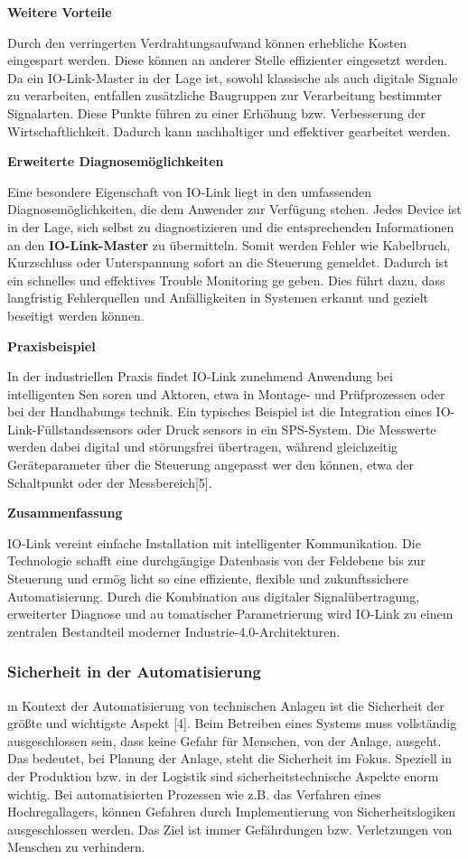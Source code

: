 \textbf{Weitere Vorteile}



Durch den verringerten Verdrahtungsaufwand können erhebliche Kosten eingespart
werden. Diese können an anderer Stelle effizienter eingesetzt werden.
Da ein IO-Link-Master in der Lage ist, sowohl klassische als auch digitale Signale zu
verarbeiten, entfallen zusätzliche Baugruppen zur Verarbeitung bestimmter Signalarten.
Diese Punkte führen zu einer Erhöhung bzw. Verbesserung der Wirtschaftlichkeit.
Dadurch kann nachhaltiger und effektiver gearbeitet werden.


\textbf{Erweiterte Diagnosemöglichkeiten}


Eine besondere Eigenschaft von IO-Link liegt in den umfassenden Diagnosemöglichkeiten, die dem Anwender zur Verfügung stehen. Jedes Device ist in der Lage, sich selbst
zu diagnostizieren und die entsprechenden Informationen an den \textbf{IO-Link-Master} zu
übermitteln.
Somit werden Fehler wie Kabelbruch, Kurzschluss oder Unterspannung sofort an die
Steuerung gemeldet. Dadurch ist ein schnelles und effektives Trouble Monitoring ge
geben. Dies führt dazu, dass langfristig Fehlerquellen und Anfälligkeiten in Systemen
erkannt und gezielt beseitigt werden können.


\textbf{Praxisbeispiel}


In der industriellen Praxis findet IO-Link zunehmend Anwendung bei intelligenten Sen
soren und Aktoren, etwa in Montage- und Prüfprozessen oder bei der Handhabungs
technik.
Ein typisches Beispiel ist die Integration eines IO-Link-Füllstandssensors oder Druck
sensors in ein SPS-System. Die Messwerte werden dabei digital und störungsfrei
übertragen, während gleichzeitig Geräteparameter über die Steuerung angepasst wer
den können, etwa der Schaltpunkt oder der Messbereich[5].



\textbf{Zusammenfassung}


IO-Link vereint einfache Installation mit intelligenter Kommunikation. Die Technologie
schafft eine durchgängige Datenbasis von der Feldebene bis zur Steuerung und ermög
licht so eine effiziente, flexible und zukunftssichere Automatisierung.
Durch die Kombination aus digitaler Signalübertragung, erweiterter Diagnose und au
tomatischer Parametrierung wird IO-Link zu einem zentralen Bestandteil moderner
Industrie-4.0-Architekturen.


\subsubsection{Sicherheit in der Automatisierung}
m Kontext der Automatisierung von technischen Anlagen ist die Sicherheit der größte
und wichtigste Aspekt [4].
Beim Betreiben eines Systems muss vollständig ausgeschlossen sein, dass keine
Gefahr für Menschen, von der Anlage, ausgeht. Das bedeutet, bei Planung der Anlage,
steht die Sicherheit im Fokus.
Speziell in der Produktion bzw. in der Logistik sind sicherheitstechnische Aspekte enorm
wichtig.
Bei automatisierten Prozessen wie z.B. das Verfahren eines Hochregallagers, können
Gefahren durch Implementierung von Sicherheitslogiken ausgeschlossen werden.
Das Ziel ist immer Gefährdungen bzw. Verletzungen von Menschen zu verhindern.



